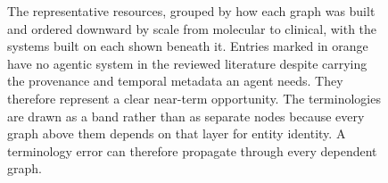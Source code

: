\begin{figure}[!t]
{%
}
\caption{The representative resources, grouped by how each graph was built and ordered downward by scale from molecular to clinical, with the systems built on each shown beneath it. Entries marked in orange have no agentic system in the reviewed literature despite carrying the provenance and temporal metadata an agent needs. They therefore represent a clear near-term opportunity. The terminologies are drawn as a band rather than as separate nodes because every graph above them depends on that layer for entity identity. A terminology error can therefore propagate through every dependent graph.}
\label{fig:datamap}
\end{figure}
